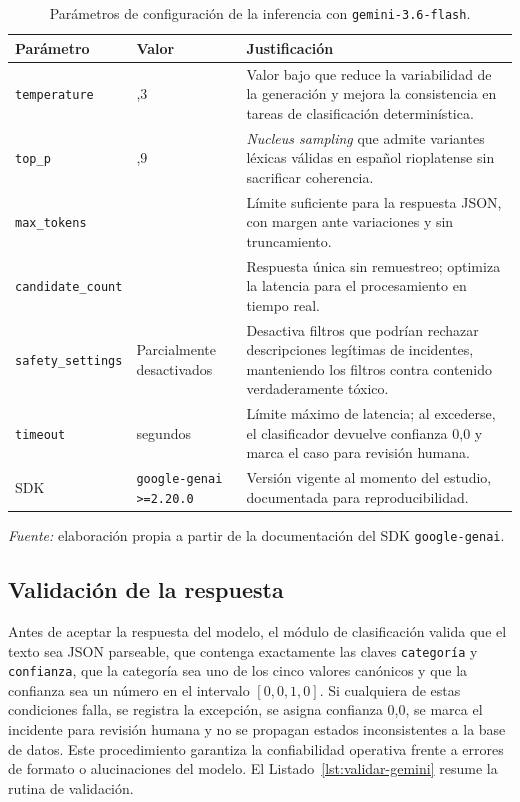 \begin{table}[htbp]
\small
\centering
\caption{Parámetros de configuración de la inferencia con \texttt{gemini-3.6-flash}.}
\label{tab:anexo_gemini_params}
\begin{tabular}{@{}>{\raggedright\arraybackslash}p{3.0cm} >{\raggedright\arraybackslash}p{2.6cm} >{\raggedright\arraybackslash}p{8.4cm}@{}}
\toprule
Parámetro & Valor & Justificación \\
\midrule
\texttt{temperature} & 0,3 & Valor bajo que reduce la variabilidad de la generación y mejora la consistencia en tareas de clasificación determinística. \\
\texttt{top\_p} & 0,9 & \emph{Nucleus sampling} que admite variantes léxicas válidas en español rioplatense sin sacrificar coherencia. \\
\texttt{max\_tokens} & 100 & Límite suficiente para la respuesta JSON, con margen ante variaciones y sin truncamiento. \\
\texttt{candidate\_count} & 1 & Respuesta única sin remuestreo; optimiza la latencia para el procesamiento en tiempo real. \\
\texttt{safety\_settings} & Parcialmente desactivados & Desactiva filtros que podrían rechazar descripciones legítimas de incidentes, manteniendo los filtros contra contenido verdaderamente tóxico. \\
\texttt{timeout} & 10 segundos & Límite máximo de latencia; al excederse, el clasificador devuelve confianza 0,0 y marca el caso para revisión humana. \\
SDK & \texttt{google-genai} \texttt{>=2.20.0} & Versión vigente al momento del estudio, documentada para reproducibilidad. \\
\bottomrule
\end{tabular}
{\footnotesize\textit{Fuente:} elaboración propia a partir de la documentación del SDK \texttt{google-genai}.\par}
\end{table}

\subsection{Validación de la respuesta}\label{subsec:anexo-validacion-respuesta}

Antes de aceptar la respuesta del modelo, el módulo de clasificación valida que el texto sea JSON parseable, que contenga exactamente las claves \texttt{categoría} y \texttt{confianza}, que la categoría sea uno de los cinco valores canónicos y que la confianza sea un número en el intervalo \([0{,}0, 1{,}0]\). Si cualquiera de estas condiciones falla, se registra la excepción, se asigna confianza 0,0, se marca el incidente para revisión humana y no se propagan estados inconsistentes a la base de datos. Este procedimiento garantiza la confiabilidad operativa frente a errores de formato o alucinaciones del modelo. El Listado~\ref{lst:validar-gemini} resume la rutina de validación.

